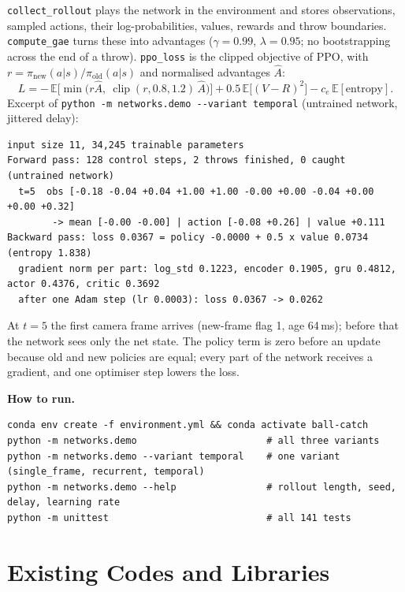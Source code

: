 \documentclass[10pt,a4paper]{article}
\newcommand{\code}[1]{\texttt{#1}}
\begin{document}
\code{collect\_rollout} plays the network in the environment and stores observations, sampled actions,
their log-probabilities, values, rewards and throw boundaries. \code{compute\_gae} turns these into
advantages ($\gamma = 0.99$, $\lambda = 0.95$; no bootstrapping across the end of a throw).
\code{ppo\_loss} is the clipped objective of PPO, with $r = \pi_{\text{new}}(a|s)/\pi_{\text{old}}(a|s)$
and normalised advantages $\hat A$:
\[
  L = -\,\mathbb{E}\big[\min\big(r\hat A,\ \operatorname{clip}(r, 0.8, 1.2)\,\hat A\big)\big]
      + 0.5\,\mathbb{E}\big[(V - R)^2\big] - c_e\,\mathbb{E}[\text{entropy}] .
\]
Excerpt of \code{python -m networks.demo -{}-variant temporal} (untrained network, jittered delay):
{\small
\begin{verbatim}
input size 11, 34,245 trainable parameters
Forward pass: 128 control steps, 2 throws finished, 0 caught (untrained network)
  t=5  obs [-0.18 -0.04 +0.04 +1.00 +1.00 -0.00 +0.00 -0.04 +0.00 +0.00 +0.32]
        -> mean [-0.00 -0.00] | action [-0.08 +0.26] | value +0.111
Backward pass: loss 0.0367 = policy -0.0000 + 0.5 x value 0.0734   (entropy 1.838)
  gradient norm per part: log_std 0.1223, encoder 0.1905, gru 0.4812, actor 0.4376, critic 0.3692
  after one Adam step (lr 0.0003): loss 0.0367 -> 0.0262
\end{verbatim}
}
At $t=5$ the first camera frame arrives (new-frame flag 1, age 64\,ms); before that the network sees
only the net state. The policy term is zero before an update because old and new policies are equal;
every part of the network receives a gradient, and one optimiser step lowers the loss.

\noindent\begin{minipage}{\textwidth}
\textbf{How to run.}
{\small
\begin{verbatim}
conda env create -f environment.yml && conda activate ball-catch
python -m networks.demo                       # all three variants
python -m networks.demo --variant temporal    # one variant (single_frame, recurrent, temporal)
python -m networks.demo --help                # rollout length, seed, delay, learning rate
python -m unittest                            # all 141 tests
\end{verbatim}
}
\end{minipage}

\section{Existing Codes and Libraries}
\end{document}
